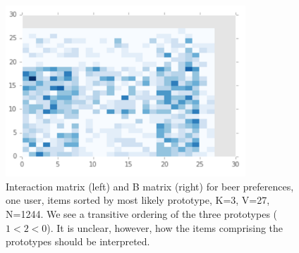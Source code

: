 \begin{figure}
\centering
\includegraphics[width=9cm]{images/interactions_beer}
\hfill{}
\caption{Interaction matrix (left) and B matrix (right) for beer preferences, one user, items sorted by most likely prototype, K=3, V=27, N=1244. We see a transitive ordering of the three prototypes ($1 < 2 < 0$). It is unclear, however, how the items comprising the prototypes should be interpreted.}
\label{fig:interactions_beer} 
\end{figure}